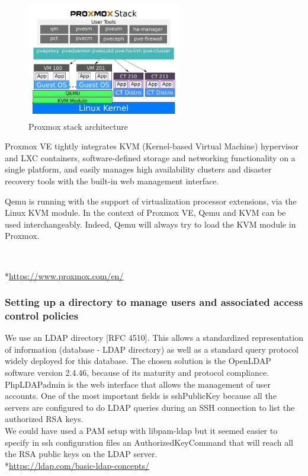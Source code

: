 \begin{figure}[!h]
  \centering
  \includegraphics[width=0.6\textwidth]{images/proxmox-stack-example.jpg}
  \caption{Proxmox stack architecture}
  \label{Proxmox}
\end{figure}

\vspace{1cm}
Proxmox VE tightly integrates KVM (Kernel-based Virtual Machine) hypervisor and LXC
containers, software-defined storage and networking functionality on a
single platform, and easily manages high availability clusters and
disaster recovery tools with the built-in web management interface.

\vspace{0.5cm}
Qemu is running with the support of virtualization
processor extensions, via the Linux KVM module. In the context of
Proxmox VE, Qemu and KVM can be used interchangeably. Indeed, Qemu will always try to load the KVM module in Proxmox.

\\
\vspace{1cm}

*\url{https://www.proxmox.com/en/}

\pagebreak

\subsubsection{Setting up a directory to manage users and associated access control policies}

\vspace{0.4cm}

We use an LDAP directory [RFC 4510].
This allows a standardized representation of information (database - LDAP directory) as well as a standard query protocol widely deployed for this database.
The chosen solution is the OpenLDAP software version 2.4.46, because of its
maturity and protocol compliance. PhpLDAPadmin is the web interface that
allows the management of user accounts. One of the most important fields is
sshPublicKey because all the servers are configured to do LDAP queries
during an SSH connection to list the authorized RSA keys.
\\ We could have used a PAM setup with libpam-ldap but it seemed easier to specify
in ssh configuration files an AuthorizedKeyCommand that will reach all the
RSA public keys on the LDAP server.
\\
*\url{https://ldap.com/basic-ldap-concepts/}

